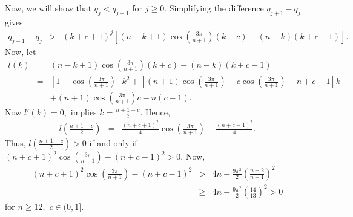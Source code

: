 \documentclass[final]{siamltex}
\begin{document}
 
 Now, we will show that $q_{j} < q_{j+1}$ for $j \geq 0.$ Simplifying the difference $q_{j+1}-q_{j}$ gives
  \begin{eqnarray*} q_{j+1} - q_{j} & > &  (k+c+1)^{j} \left[ (n-k+1) \cos \left( \frac{3 \pi}{n+1} \right) (k+c) - (n-k)(k+c-1) \right]. 
  \end{eqnarray*}
 Now, let 
 \begin{eqnarray*} l(k) & = & (n-k+1) \cos \left( \frac{3 \pi}{n+1} \right) (k+c) - (n-k)(k+c-1) \\
  & = & \left[ 1 - \cos \left( \frac{3 \pi}{n+1} \right) \right]k^{2} + \left[ (n+1)\cos \left( \frac{3 \pi}{n+1} \right) - c \cos \left( \frac{3 \pi}{n+1} \right) -n + c -1 \right] k  \\ & &  + (n+1)\cos \left( \frac{3 \pi}{n+1} \right)c -n(c-1). 
 \end{eqnarray*}
 Now $l'(k) = 0,$ implies $k = \frac{n+1-c}{2}.$ Hence,
 \begin{eqnarray*} l \left( \frac{n+1-c}{2} \right) & = & \frac{ (n+c+1)^{2}}{4} \cos \left( \frac{3 \pi}{n+1} \right) - \frac{ (n+c-1)^{2}}{4}.
  \end{eqnarray*}
 Thus, $l \left( \frac{n+1-c}{2} \right) > 0$ if and only if $ (n+c+1)^{2} \cos \left( \frac{3 \pi}{n+1} \right) - (n+c-1)^{2} > 0.$ Now,
 \begin{eqnarray*} (n+c+1)^{2} \cos \left( \frac{3 \pi}{n+1} \right) - (n+c-1)^{2} & > & 4n - \frac{9 \pi^{2}}{2} \left( \frac{n+2}{n+1} \right)^{2} \\
  & \geq & 4n - \frac{9 \pi^{2}}{2} \left( \frac{14}{13} \right)^{2}  >  0   
 \end{eqnarray*} 
  for $n \geq 12,$ $c \in (0,1].$ 
\end{document}
